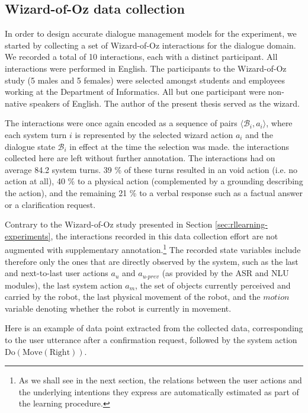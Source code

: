 \subsection{Wizard-of-Oz data collection}
\label{sec:wozcollection-exp3}

In order to design accurate dialogue management models for the experiment, we started by collecting a set of Wizard-of-Oz interactions for the dialogue domain. We recorded a total of 10 interactions, each with a distinct participant. All interactions were performed in English. The participants to the Wizard-of-Oz study (5 males and 5 females) were selected amongst students and employees working at the Department of Informatics. All but one participant were non-native speakers of English. The author of the present thesis served as the wizard.

The interactions were once again encoded as a sequence of pairs $\langle \mathcal{B}_i, a_i \rangle$, where each system turn $i$ is represented by the selected wizard action $a_i$ and the dialogue state $\mathcal{B}_i$ in effect at the time the selection was made. the interactions collected here are left without further annotation. The interactions had on average 84.2 system turns.  39 \% of these turns resulted in an void action (i.e. no action at all), 40 \% to a physical action (complemented by a grounding describing the action), and the remaining 21 \% to a verbal response such as a factual answer or a clarification request. 

Contrary to the Wizard-of-Oz study presented in Section \ref{sec:rllearning-experiments}, the interactions recorded in this data collection effort are not augmented with supplementary annotation.\footnote{As we shall see in the next section, the relations between the user actions and the underlying intentions they express are automatically estimated as part of the learning procedure.} The recorded state variables include therefore only the ones that are directly observed by the system, such as the last and next-to-last user actions $a_u$ and $a_{u\mbox{-}prev}$ (as provided by the ASR and NLU modules), the last system action $a_m$, the set of objects currently perceived and carried by the robot, the last physical movement of the robot, and the $\mathit{motion}$ variable denoting whether the robot is currently in movement. 

Here is an example of data point extracted from the collected data, corresponding to the user utterance  after a confirmation request, followed by the system action $\mathrm{Do(Move(Right))}$. 

